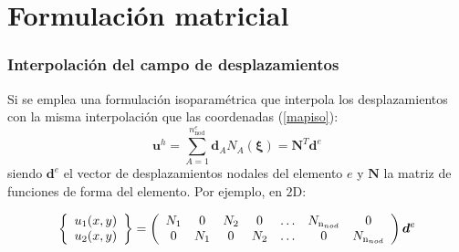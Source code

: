 \documentclass[handout]{beamer}
\begin{document}
\section{Formulación matricial}
\begin{frame}
\frametitle{Interpolación del campo de desplazamientos}

Si se emplea una formulación isoparamétrica que interpola los
desplazamientos con la misma interpolación que las coordenadas
(\ref{mapiso}):
\begin{equation}
\bm{u}^h=\sum_{A=1}^{n^e_{\textrm{nod}}}
\bm{d}_{A} N_{A}(\bm{\xi}) = \mathbf{N}^{T} \bm{d}^e \label{disiso}
\end{equation}
siendo $\bm{d}^e$ el vector de desplazamientos nodales del elemento $e$
y $\mathbf{N}$ la matriz de funciones de forma del elemento. Por ejemplo, en
$2$D:
\begin{small}
\begin{equation}
\left\{
\begin{array}{c}
u_1(x,y) \\
u_2(x,y) 
\end{array}
\right\}=
\left(
\begin{array}{ccccccc}
N_1 &  0  & N_2 &  0  & \ldots & N_{\textrm n_{nod}} & 0                    \\
0   & N_1 &  0  & N_2 & \ldots &           0          & N_{\textrm n_{nod}}
\end{array}
\right) \bm{d}^e
\label{indisge}
\end{equation}
\end{small}
\end{frame}
\end{document}
